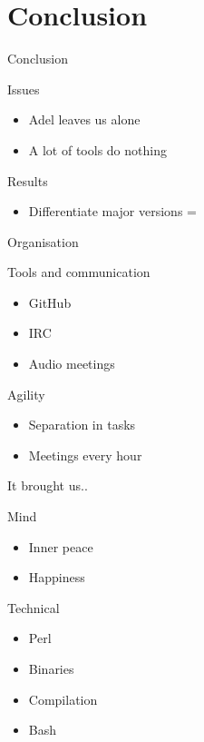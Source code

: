 \documentclass[11pt]{beamer}
\begin{document}
\section{Conclusion}


\begin{frame}{Conclusion}

	\begin{block}{Issues}
		\begin{itemize}
			\item Adel leaves us alone
			\item A lot of tools do nothing
		\end{itemize}
	
	\end{block}
	\begin{block}{Results}
		\begin{itemize}
			\item Differentiate major versions =
		\end{itemize}
		
	\end{block}
\end{frame}

\begin{frame}{Organisation}

\begin{block}{Tools and communication}
\begin{itemize}
	\item GitHub
	\item IRC
	\item Audio meetings
\end{itemize}
\end{block}

\begin{block}{Agility}
	\begin{itemize}
		\item Separation in tasks
		\item Meetings every hour
	\end{itemize}
\end{block}


\end{frame}

\begin{frame}{It brought us..}


\begin{block}{Mind}
	\begin{itemize}
		\item Inner peace
		\item Happiness
	\end{itemize}
\end{block}

\begin{block}{Technical}
	\begin{itemize}
		\item Perl
		\item Binaries
		\item Compilation
		\item Bash
	\end{itemize}
	
\end{block}

\end{frame}
\end{document}
